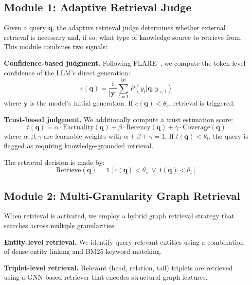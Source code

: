 \documentclass[11pt,a4paper]{article}
\begin{document}
\subsection{Module 1: Adaptive Retrieval Judge}

Given a query $\mathbf{q}$, the adaptive retrieval judge determines whether external retrieval is necessary and, if so, what type of knowledge source to retrieve from. This module combines two signals:

\textbf{Confidence-based judgment.} Following FLARE~\cite{jiang2023active}, we compute the token-level confidence of the LLM's direct generation:
\begin{equation}
    c(\mathbf{q}) = \frac{1}{|\mathbf{y}|} \sum_{t=1}^{|\mathbf{y}|} P(y_t | \mathbf{q}, y_{<t})
\end{equation}
where $\mathbf{y}$ is the model's initial generation. If $c(\mathbf{q}) < \theta_c$, retrieval is triggered.

\textbf{Trust-based judgment.} We additionally compute a trust estimation score:
\begin{equation}
    t(\mathbf{q}) = \alpha \cdot \text{Factuality}(\mathbf{q}) + \beta \cdot \text{Recency}(\mathbf{q}) + \gamma \cdot \text{Coverage}(\mathbf{q})
\end{equation}
where $\alpha, \beta, \gamma$ are learnable weights with $\alpha + \beta + \gamma = 1$. If $t(\mathbf{q}) < \theta_t$, the query is flagged as requiring knowledge-grounded retrieval.

The retrieval decision is made by:
\begin{equation}
    \text{Retrieve}(\mathbf{q}) = \mathbb{1}[c(\mathbf{q}) < \theta_c \;\lor\; t(\mathbf{q}) < \theta_t]
\end{equation}

\subsection{Module 2: Multi-Granularity Graph Retrieval}

When retrieval is activated, we employ a hybrid graph retrieval strategy that searches across multiple granularities:

\textbf{Entity-level retrieval.} We identify query-relevant entities using a combination of dense entity linking and BM25 keyword matching.

\textbf{Triplet-level retrieval.} Relevant (head, relation, tail) triplets are retrieved using a GNN-based retriever that encodes structural graph features.
\end{document}
